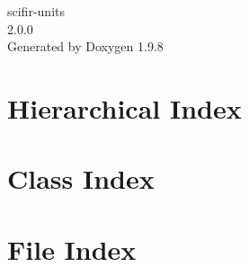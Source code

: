 \documentclass[twoside]{book}
\newcommand{\+}{\discretionary{\mbox{\scriptsize$\hookleftarrow$}}{}{}}
\newcommand{\clearemptydoublepage}{%
    \newpage{\pagestyle{empty}\cleardoublepage}%
  }
\begin{document}
  \raggedbottom
    \hypersetup{pageanchor=false,
                bookmarksnumbered=true,
                pdfencoding=unicode
               }
  \begin{titlepage}
  \vspace*{7cm}
  \begin{center}%
  {\Large scifir-\/units}\\
  [1ex]\large 2.\+0.\+0 \\
  \vspace*{1cm}
  {\large Generated by Doxygen 1.9.8}\\
  \end{center}
  \end{titlepage}
  \clearemptydoublepage
  \tableofcontents
  \clearemptydoublepage
  \hypersetup{pageanchor=true}







\chapter{Hierarchical Index}

\chapter{Class Index}

\chapter{File Index}

\end{document}
